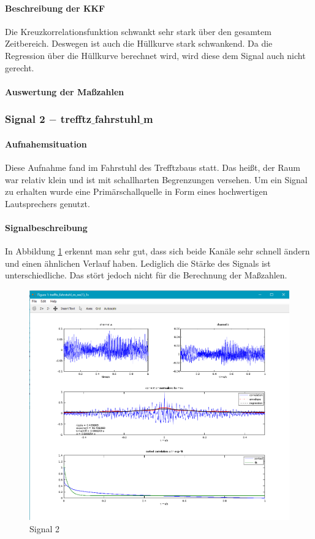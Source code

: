 \paragraph{Beschreibung der KKF} Die Kreuzkorrelationsfunktion schwankt sehr stark über den gesamtem Zeitbereich. Deswegen ist auch die Hüllkurve stark schwankend. Da die Regression über die Hüllkurve berechnet wird, wird diese dem Signal auch nicht gerecht.
\paragraph{Auswertung der Maßzahlen}

\subsubsection{Signal 2 $-$ trefftz$\_$fahrstuhl$\_$m}
\paragraph{Aufnahemsituation} Diese Aufnahme fand im Fahrstuhl des Trefftzbaus statt. Das heißt, der Raum war relativ klein und ist mit schallharten Begrenzungen versehen. Um ein Signal zu erhalten wurde eine Primärschallquelle in Form eines hochwertigen Lautsprechers genutzt.
\paragraph{Signalbeschreibung}
In Abbildung \ref{figure3}  erkennt man sehr gut, dass sich beide Kanäle sehr schnell ändern und einen ähnlichen Verlauf haben. Lediglich die Stärke des Signals ist unterschiedliche. Das stört jedoch nicht für die Berechnung der Maßzahlen. 
\begin{figure}[ht!]
\centering
\includegraphics[scale=0.64]{img/trefftz_fahrstuhl_m}
\caption{Signal 2}
\label{figure3}
\end{figure}
